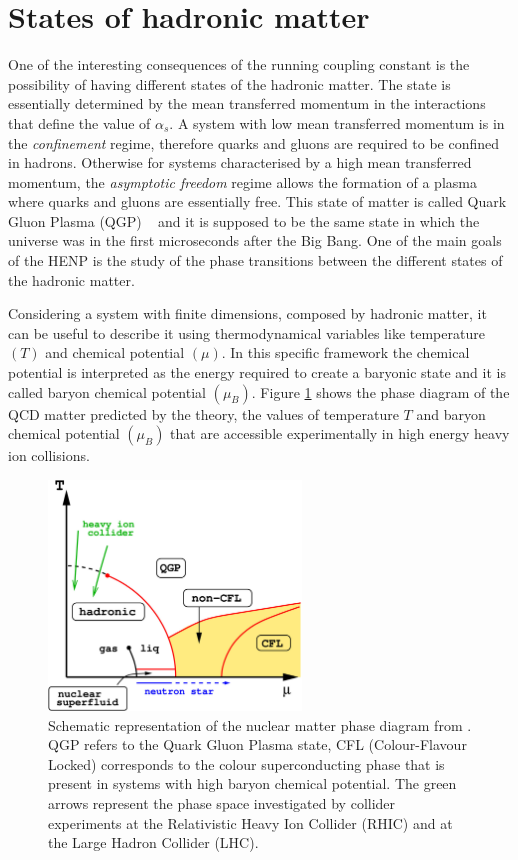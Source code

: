 %
%
\section{States of hadronic matter}
\label{sec:1.2}

One of the interesting consequences of the running coupling constant is the possibility of having
different states of the hadronic matter. The state is essentially determined by the mean transferred 
momentum in the interactions that define the value of $\alpha_{s}$. 
A system with low mean transferred momentum is in the \textit{confinement} regime, therefore quarks
and gluons are required to be confined in hadrons. Otherwise for systems characterised by a high mean
transferred momentum, the \textit{asymptotic freedom} regime allows the formation of a plasma where
quarks and gluons are essentially free.
This state of matter is called Quark Gluon Plasma (QGP) ~\cite{firstQGP} and it is supposed to be the same state in
which the universe was in the first microseconds after the Big Bang.
One of the main goals of the HENP is the study of the phase transitions between the different
states of the hadronic matter.

Considering a system with finite dimensions, composed by hadronic matter, it can be useful to describe it 
using thermodynamical variables like temperature $(T)$ and chemical potential $(\mu)$. In this
specific framework the chemical potential is interpreted as the energy required to create a 
baryonic state and it is called baryon chemical potential $(\mu_{B})$. 
Figure \ref{fig:qgpdiagram} shows the phase diagram of the QCD matter predicted by the theory, 
the values of temperature $T$ and baryon chemical potential $(\mu_{B})$ that are accessible
experimentally in high energy heavy ion collisions.

\begin{figure}
    \centering
    \includegraphics[width=0.6\textwidth]{gfx/qgpphase}
	\caption{Schematic representation of the nuclear matter phase diagram from \cite{qgpphase}. QGP refers to the Quark Gluon Plasma state, CFL (Colour-Flavour Locked) corresponds to the colour superconducting phase that is present in systems with high baryon chemical potential. The green arrows represent the phase space investigated by collider experiments at the Relativistic Heavy Ion Collider (RHIC) and at the Large Hadron Collider (LHC).}
	\label{fig:qgpdiagram}
\end{figure}

